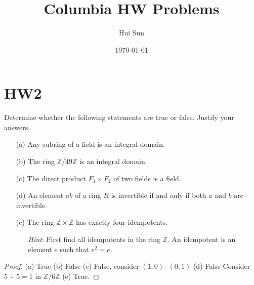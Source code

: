\documentclass[openany]{book}
\title{Columbia HW Problems}
\date{\today}
\author{Hui Sun}
\newcommand{\Z}{\mathbb{Z}}
\begin{document}
\maketitle

\tableofcontents
\newpage

\chapter{HW2}

\begin{prob}[1]
    Determine whether the following statements are true or false. Justify your answers.

\begin{enumerate}
    \item[(a)] Any subring of a field is an integral domain.
    
    \item[(b)] The ring \(\mathbb{Z}/49\mathbb{Z}\) is an integral domain.
    
    \item[(c)] The direct product \(F_1 \times F_2\) of two fields is a field.
    
    \item[(d)] An element \(ab\) of a ring \(R\) is invertible if and only if both \(a\) and \(b\) are invertible.
    
    \item[(e)] The ring \(\mathbb{Z} \times \mathbb{Z}\) has exactly four idempotents. 
    \begin{itemize}
        \item[\textit{Hint}:] First find all idempotents in the ring \(\mathbb{Z}\). An idempotent is an element \(e\) such that \(e^2 = e\).
    \end{itemize}
\end{enumerate}
\end{prob}
\begin{proof}
    (a) True (b) False (c) False, consider $(1,0)\cdot (0,1)$ (d) False Consider $5+5=1$ in $\Z/6\Z$ (e) True.
\end{proof}
\end{document}
